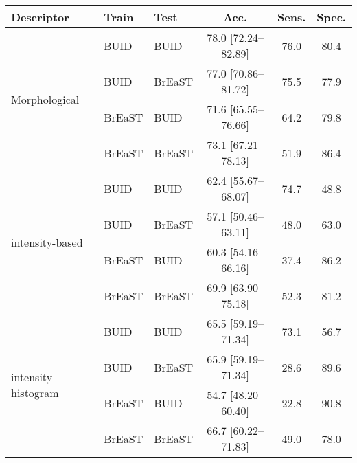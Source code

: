 \begin{tabular}{lllccc}\\ 
\toprule
Descriptor & Train &Test & Acc. & Sens. &Spec.\\ 
\midrule
\multirow{4}{*}{Morphological} & BUID & BUID & 78.0 [72.24--82.89] & 76.0 & 80.4\\ 
 & BUID & BrEaST & 77.0 [70.86--81.72] & 75.5 & 77.9\\ 
 & BrEaST & BUID & 71.6 [65.55--76.66] & 64.2 & 79.8\\ 
 & BrEaST & BrEaST & 73.1 [67.21--78.13] & 51.9 & 86.4\\ 
\midrule
\multirow{4}{*}{intensity-based} & BUID & BUID & 62.4 [55.67--68.07] & 74.7 & 48.8\\ 
 & BUID & BrEaST & 57.1 [50.46--63.11] & 48.0 & 63.0\\ 
 & BrEaST & BUID & 60.3 [54.16--66.16] & 37.4 & 86.2\\ 
 & BrEaST & BrEaST & 69.9 [63.90--75.18] & 52.3 & 81.2\\ 
\midrule
\multirow{4}{*}{intensity-histogram} & BUID & BUID & 65.5 [59.19--71.34] & 73.1 & 56.7\\ 
 & BUID & BrEaST & 65.9 [59.19--71.34] & 28.6 & 89.6\\ 
 & BrEaST & BUID & 54.7 [48.20--60.40] & 22.8 & 90.8\\ 
 & BrEaST & BrEaST & 66.7 [60.22--71.83] & 49.0 & 78.0\\ 
\bottomrule
\end{tabular}
